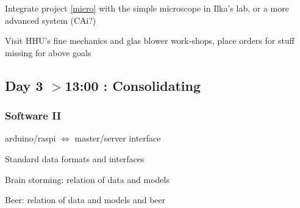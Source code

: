 \documentclass[12pt,a4paper]{scrartcl}
\begin{document}
Integrate project \ref{micro} with the simple microscope in Ilka's lab,
or a more advanced system (CAi?)

Visit HHU's fine mechanics and glas blower work-shops, place orders 
for stuff missing for above goals


\subsection{Day 3 $>$13:00 : Consolidating}

\subsubsection{Software II}
arduino/raspi $\Leftrightarrow$  master/server interface

Standard data formats and interfaces

Brain storming: relation of data and models

Beer: relation of data and models and beer
\end{document}
